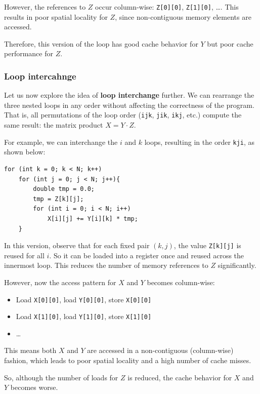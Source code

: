 \documentclass[12pt]{book}
\begin{document}
However, the references to $Z$ occur column-wise: \texttt{Z[0][0]}, \texttt{Z[1][0]}, \dots. This results in poor spatial locality for $Z$, since non-contiguous memory elements are accessed. 

Therefore, this version of the loop has good cache behavior for $Y$ but poor cache performance for $Z$.

\subsubsection*{Loop intercahnge}
Let us now explore the idea of \textbf{loop interchange} further. We can rearrange the three nested loops in any order without affecting the correctness of the program. That is, all permutations of the loop order (\texttt{ijk}, \texttt{jik}, \texttt{ikj}, etc.) compute the same result: the matrix product $X = Y \cdot Z$.

For example, we can interchange the $i$ and $k$ loops, resulting in the order \texttt{kji}, as shown below:

\begin{lstlisting}[style=cppstyle, caption={Matrix multiplication with loop order kji}, label={lst:kji-matmul}]
for (int k = 0; k < N; k++)
    for (int j = 0; j < N; j++){
        double tmp = 0.0;
        tmp = Z[k][j];
        for (int i = 0; i < N; i++)
            X[i][j] += Y[i][k] * tmp;
    }
\end{lstlisting}

In this version, observe that for each fixed pair $(k, j)$, the value \texttt{Z[k][j]} is reused for all $i$. So it can be loaded into a register once and reused across the innermost loop. This reduces the number of memory references to $Z$ significantly.

However, now the access pattern for $X$ and $Y$ becomes column-wise:
\begin{itemize}
    \item Load \texttt{X[0][0]}, load \texttt{Y[0][0]}, store \texttt{X[0][0]}
    \item Load \texttt{X[1][0]}, load \texttt{Y[1][0]}, store \texttt{X[1][0]}
    \item \dots
\end{itemize}

This means both $X$ and $Y$ are accessed in a non-contiguous (column-wise) fashion, which leads to poor spatial locality and a high number of cache misses.

So, although the number of loads for $Z$ is reduced, the cache behavior for $X$ and $Y$ becomes worse.
\end{document}
